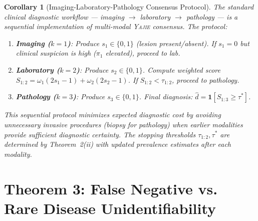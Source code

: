 \documentclass[11pt,a4paper]{article}
\newtheorem{corollary}[theorem]{Corollary}
\theoremstyle{definition}
\newcommand{\Yajie}{\textsc{Yajie}}
\newcommand{\ind}[1]{\mathbf{1}[#1]}
\newcommand{\diagnosis}{\hat{d}}               %
\begin{document}
\begin{corollary}[Imaging-Laboratory-Pathology Consensus Protocol]
\label{cor:ILP_protocol}
The standard clinical diagnostic workflow --- imaging $\to$ laboratory $\to$
pathology --- is a sequential implementation of multi-modal \Yajie{} consensus.
The protocol:
\begin{enumerate}[nosep]
    \item \textbf{Imaging ($k=1$)}: Produce $s_1 \in \{0,1\}$ (lesion present/absent).
    If $s_1 = 0$ but clinical suspicion is high ($\pi_1$ elevated), proceed to lab.
    \item \textbf{Laboratory ($k=2$)}: Produce $s_2 \in \{0,1\}$.
    Compute weighted score $S_{1:2} = \omega_1(2s_1-1) + \omega_2(2s_2-1)$.
    If $S_{1:2} < \tau_{1:2}$, proceed to pathology.
    \item \textbf{Pathology ($k=3$)}: Produce $s_3 \in \{0,1\}$.
    Final diagnosis: $\diagnosis = \ind{S_{1:3} \ge \tau^*}$.
\end{enumerate}
This sequential protocol minimizes expected diagnostic cost by avoiding
unnecessary invasive procedures (biopsy for pathology) when earlier modalities
provide sufficient diagnostic certainty. The stopping thresholds
$\tau_{1:2}, \tau^*$ are determined by Theorem~2(ii) with updated
prevalence estimates after each modality.
\end{corollary}

\section{Theorem 3: False Negative vs. Rare Disease Unidentifiability}
\label{sec:thm3}
\end{document}
